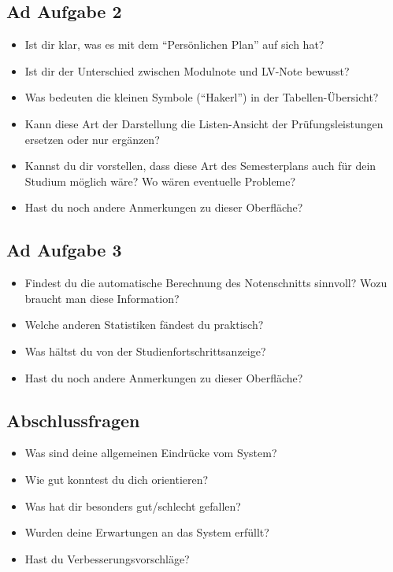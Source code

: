 \documentclass[a4paper,10pt]{scrartcl}
\begin{document}
\subsection{Ad Aufgabe 2}

\begin{itemize}
 \item Ist dir klar, was es mit dem ``Persönlichen Plan'' auf sich hat?
 \item Ist dir der Unterschied zwischen Modulnote und LV-Note bewusst?
 \item Was bedeuten die kleinen Symbole (``Hakerl'') in der Tabellen-Übersicht?
 \item Kann diese Art der Darstellung die Listen-Ansicht der Prüfungsleistungen ersetzen oder nur ergänzen?
 \item Kannst du dir vorstellen, dass diese Art des Semesterplans auch für dein Studium möglich wäre? Wo wären eventuelle Probleme?
 \item Hast du noch andere Anmerkungen zu dieser Oberfläche?
\end{itemize}

\subsection{Ad Aufgabe 3}

\begin{itemize}
 \item Findest du die automatische Berechnung des Notenschnitts sinnvoll? Wozu braucht man diese Information?
 \item Welche anderen Statistiken fändest du praktisch?
 \item Was hältst du von der Studienfortschrittsanzeige?
 \item Hast du noch andere Anmerkungen zu dieser Oberfläche?
\end{itemize}

\subsection{Abschlussfragen}

\begin{itemize}
 \item Was sind deine allgemeinen Eindrücke vom System?
 \item Wie gut konntest du dich orientieren?
 \item Was hat dir besonders gut/schlecht gefallen?
 \item Wurden deine Erwartungen an das System erfüllt?
 \item Hast du Verbesserungsvorschläge?
\end{itemize}
\end{document}
